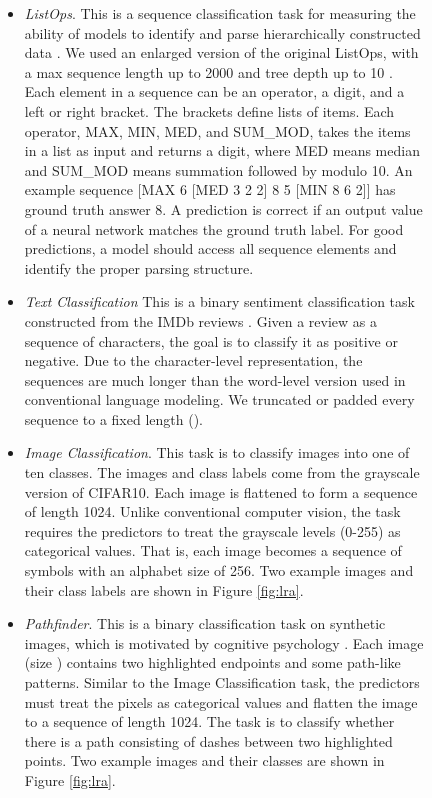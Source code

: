 \documentclass{article}
\begin{document}
\begin{figure}[t]
\begin{center}
\begin{itemize}
    \item \emph{ListOps}. This is a sequence classification task for measuring the ability of models to identify and parse hierarchically constructed data \citep{nangia2018listops}. We used an enlarged version of the original ListOps, with a max sequence length up to 2000 and tree depth up to 10 \citep{tay2020long}. Each element in a sequence can be an operator, a digit, and a left or right bracket. The brackets define lists of items. Each operator, MAX, MIN, MED, and SUM\_MOD, takes the items in a list as input and returns a digit, where MED means median and SUM\_MOD means summation followed by modulo 10. An example sequence [MAX 6 [MED 3 2 2] 8 5 [MIN 8 6 2]] has ground truth answer 8. A prediction is correct if an output value of a neural network matches the ground truth label. For good predictions, a model should access all sequence elements and identify the proper parsing structure.
    \item \emph{Text Classification} This is a binary sentiment classification task constructed from the IMDb reviews \citep{maas2011learning}. Given a review as a sequence of characters, the goal is to classify it as positive or negative. Due to the character-level representation, the sequences are much longer than the word-level version used in conventional language modeling. We truncated or padded every sequence to a fixed length ().
    \item \emph{Image Classification}. This task is to classify images into one of ten classes. The images and class labels come from the grayscale version of CIFAR10. Each image is flattened to form a sequence of length 1024. Unlike conventional computer vision, the task requires the predictors to treat the grayscale levels (0-255) as categorical values. That is, each image becomes a sequence of symbols with an alphabet size of 256. Two example images and their class labels are shown in Figure \ref{fig:lra}.
    \item \emph{Pathfinder}. This is a binary classification task on synthetic images, which is motivated by cognitive psychology \citep{linsley2018learning}. Each image (size ) contains two highlighted endpoints and some path-like patterns. Similar to the Image Classification task, the predictors must treat the pixels as categorical values and flatten the image to a sequence of length 1024. The task is to classify whether there is a path consisting of dashes between two highlighted points. Two example images and their classes are shown in Figure \ref{fig:lra}.
\end{itemize}


\end{center}
\end{figure}
\end{document}
